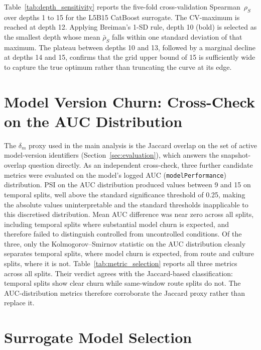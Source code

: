\documentclass[oneside]{memoir} %
\begin{document}
Table~\ref{tab:depth_sensitivity} reports the five-fold cross-validation Spearman~$\rho_S$ over depths 1 to 15 for the L5B15 CatBoost surrogate. The CV-maximum is reached at depth 12. Applying Breiman's 1-SD rule, depth 10 (bold) is selected as the smallest depth whose mean $\bar{\rho}_S$ falls within one standard deviation of that maximum. The plateau between depths 10 and 13, followed by a marginal decline at depths 14 and 15, confirms that the grid upper bound of 15 is sufficiently wide to capture the true optimum rather than truncating the curve at its edge.



\section{Model Version Churn: Cross-Check on the AUC Distribution} \label{app:metric_selection}

The $\delta_m$ proxy used in the main analysis is the Jaccard overlap on the set of active model-version identifiers (Section~\ref{sec:evaluation}), which answers the snapshot-overlap question directly. As an independent cross-check, three further candidate metrics were evaluated on the model's logged AUC (\texttt{modelPerformance}) distribution. PSI on the AUC distribution produced values between 9 and 15 on temporal splits, well above the standard significance threshold of 0.25, making the absolute values uninterpretable and the standard thresholds inapplicable to this discretised distribution. Mean AUC difference was near zero across all splits, including temporal splits where substantial model churn is expected, and therefore failed to distinguish controlled from uncontrolled conditions. Of the three, only the Kolmogorov--Smirnov statistic on the AUC distribution cleanly separates temporal splits, where model churn is expected, from route and culture splits, where it is not. Table~\ref{tab:metric_selection} reports all three metrics across all splits. Their verdict agrees with the Jaccard-based classification: temporal splits show clear churn while same-window route splits do not. The AUC-distribution metrics therefore corroborate the Jaccard proxy rather than replace it.



\section{Surrogate Model Selection} \label{app:surrogate_model_selection}
\end{document}
